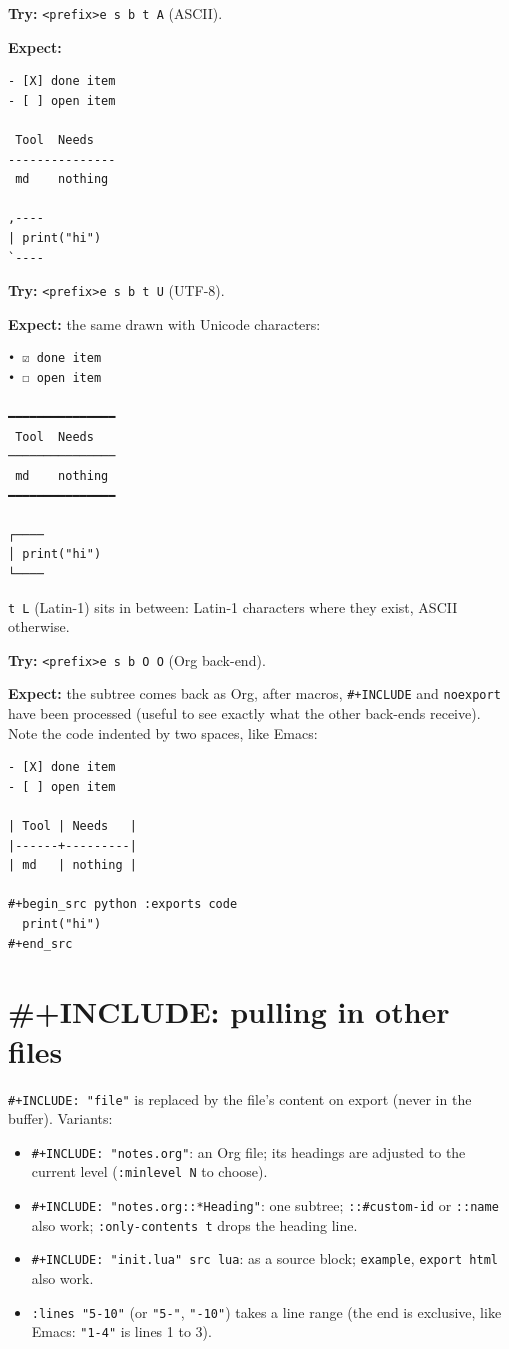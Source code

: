 \textbf{Try:} \texttt{<prefix>e s b t A} (ASCII).

\textbf{Expect:}

\begin{verbatim}
- [X] done item
- [ ] open item

 Tool  Needs
---------------
 md    nothing

,----
| print("hi")
`----
\end{verbatim}

\textbf{Try:} \texttt{<prefix>e s b t U} (UTF-8).

\textbf{Expect:} the same drawn with Unicode characters:

\begin{verbatim}
• ☑ done item
• ☐ open item

━━━━━━━━━━━━━━━
 Tool  Needs
───────────────
 md    nothing
━━━━━━━━━━━━━━━

┌────
│ print("hi")
└────
\end{verbatim}

\texttt{t L} (Latin-1) sits in between: Latin-1 characters where they exist,
ASCII otherwise.

\textbf{Try:} \texttt{<prefix>e s b O O} (Org back-end).

\textbf{Expect:} the subtree comes back as Org, after macros, \texttt{\#+INCLUDE} and
\texttt{noexport} have been processed (useful to see exactly what the other
back-ends receive). Note the code indented by two spaces, like Emacs:

\begin{verbatim}
- [X] done item
- [ ] open item

| Tool | Needs   |
|------+---------|
| md   | nothing |

#+begin_src python :exports code
  print("hi")
#+end_src
\end{verbatim}
\section{\#+INCLUDE: pulling in other files}
\label{sec:org8c8ec95}
\texttt{\#+INCLUDE: "file"} is replaced by the file's content on export (never in
the buffer). Variants:
\begin{itemize}
\item \texttt{\#+INCLUDE: "notes.org"}: an Org file; its headings are adjusted to the
current level (\texttt{:minlevel N} to choose).
\item \texttt{\#+INCLUDE: "notes.org::*Heading"}: one subtree; \texttt{::\#custom-id} or
\texttt{::name} also work; \texttt{:only-contents t} drops the heading line.
\item \texttt{\#+INCLUDE: "init.lua" src lua}: as a source block; \texttt{example},
\texttt{export html} also work.
\item \texttt{:lines "5-10"} (or \texttt{"5-"}, \texttt{"-10"}) takes a line range (the end is
exclusive, like Emacs: \texttt{"1-4"} is lines 1 to 3).
\end{itemize}
